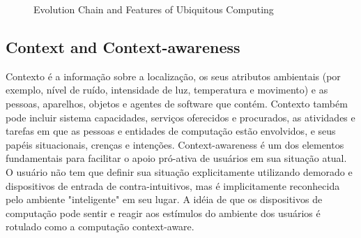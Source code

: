 \documentclass[12pt]{article} %
\begin{document}
\begin{figure}[H]
\caption{Evolution Chain and Features of Ubiquitous Computing}
\label{fig:speciation}
\end{figure}


\subsection{Context and Context-awareness} %


Contexto é a informação sobre a localização, os seus atributos ambientais (por exemplo, nível de ruído, intensidade de luz, temperatura e movimento) e as pessoas, aparelhos, objetos e agentes de software que contém. Contexto também pode incluir sistema capacidades, serviços oferecidos e procurados, as atividades e tarefas em que as pessoas e entidades de computação estão envolvidos, e seus papéis situacionais, crenças e intenções. Context-awareness é um dos elementos fundamentais para facilitar o apoio pró-ativa de usuários em sua situação atual. O usuário não tem que definir sua situação explicitamente utilizando demorado e dispositivos de entrada de contra-intuitivos, mas é implicitamente reconhecida pelo ambiente "inteligente" em seu lugar. A idéia de que os dispositivos de computação pode sentir e reagir aos estímulos do ambiente dos usuários é rotulado como a computação context-aware.
\end{document}
